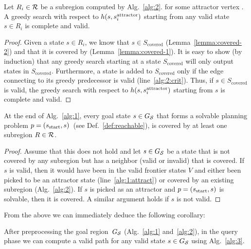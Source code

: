 \documentclass[a4paper]{report}
\begin{document}
\begin{lemma}
\label{lemma:greedy}
Let $R_i \in \mathcal{R}$ be a subregion computed by Alg.~\ref{alg:2}.
for some attractor vertex \sAttract.
% 
A greedy search with respect to $h(s, s^{\text{attractor}}_i)$  starting from any valid state $s \in R_i$ is complete and valid.
\end{lemma}

\begin{proof}
Given a state $s \in R_i$, we know that $s \in S_{\text{covered}}$ (Lemma~\ref{lemma:covered-2})
and that it is covered by \sAttract (Lemma~\ref{lemma:covered-1}).
%
It is easy to show (by induction) that any greedy search starting at a state $S_{\text{covered}}$ will only output states in $S_{\text{covered}}$.
Furthermore, a state is added to $S_{\text{covered}}$ only if the edge connecting to its greedy predecessor is valid (line~\ref{alg:2:crit}).
Thus, if $s\in S_{\text{covered}}$ is valid, the greedy search with respect to $h(s, s^{\text{attractor}}_i)$  starting from $s$ is complete and valid.
\end{proof}

\begin{lemma}
\label{lemma:coverage}
At the end of Alg.~\ref{alg:1}, every goal state $s \in G_\mathcal{S}$ that forms a solvable planning problem $p = (s_{\textrm{start}}, s)$~(see Def.~\ref{def:reachable}), is covered by at least one subregion $R \in \mathcal{R}$.
\end{lemma}
\begin{proof}
Assume that this does not hold and let $s \in G_\mathcal{S}$ be a state that is not covered by any subregion but has a neighbor (valid or invalid) that is covered.
%
If $s$ is valid, then it would have been in the valid frontier states $V$ and either been picked to be an attractor state (line~\ref{alg:1:attract}) or covered by an existing subregion (Alg.~\ref{alg:2}). If $s$ is picked as an attractor and $p = (s_{\textrm{start}}, s)$ is solvable, then it is covered.
%
A similar argument holds if $s$ is not valid.
\end{proof}

From the above we can immediately deduce the following corollary:

\vspace{2mm}

\begin{cor}
  After preprocessing the goal region~$G_\mathcal{S}$ (Alg.~\ref{alg:1} and~\ref{alg:2}), in the query phase we can compute a valid path for any valid state $s \in G_\mathcal{S}$ using Alg.~\ref{alg:3}.
\end{cor}
\end{document}
